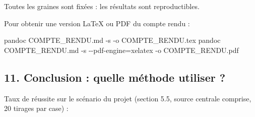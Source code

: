 \documentclass[
  french,
]{article}
\newenvironment{Shaded}{}{}
\newcommand{\AttributeTok}[1]{\textcolor[rgb]{0.49,0.56,0.16}{#1}}
\newcommand{\ExtensionTok}[1]{#1}
\newcommand{\NormalTok}[1]{#1}
\newcommand{\OperatorTok}[1]{\textcolor[rgb]{0.40,0.40,0.40}{#1}}
\begin{document}
Toutes les graines sont fixées : les résultats sont reproductibles.

Pour obtenir une version LaTeX ou PDF du compte rendu :

\begin{Shaded}
\begin{Highlighting}[]
\ExtensionTok{pandoc}\NormalTok{ COMPTE\_RENDU.md }\AttributeTok{{-}s} \AttributeTok{{-}o}\NormalTok{ COMPTE\_RENDU.tex}
\ExtensionTok{pandoc}\NormalTok{ COMPTE\_RENDU.md }\AttributeTok{{-}s} \AttributeTok{{-}{-}pdf{-}engine}\OperatorTok{=}\NormalTok{xelatex }\AttributeTok{{-}o}\NormalTok{ COMPTE\_RENDU.pdf}
\end{Highlighting}
\end{Shaded}

\subsection{11. Conclusion : quelle méthode utiliser
?}\label{conclusion-quelle-muxe9thode-utiliser}

Taux de réussite sur le scénario du projet (section 5.5, source centrale
comprise, 20 tirages par case) :
\end{document}
